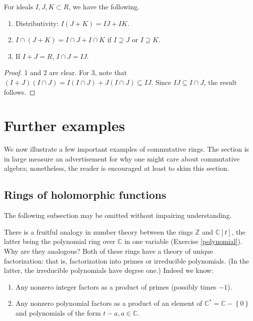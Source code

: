 \begin{proposition}
For ideals $I, J, K \subset R$, we have the following.

\begin{enumerate}
  \item Distributivity: $I(J + K) = IJ + IK$.
  \item $I \cap (J + K) = I \cap J + I \cap K$ if $I \supseteq J$ or $I \supseteq K$.
  \item If $I + J = R$, $I \cap J = IJ$.
\end{enumerate}

\begin{proof}
1 and 2 are clear.  For 3, note that $(I + J)(I \cap J) = I(I \cap J)
+ J(I \cap J) \subseteq IJ$.  Since $IJ \subseteq I \cap J$, the result
follows.
\end{proof}
\end{proposition}

\section{Further examples}

We now illustrate a few important examples of 
commutative rings. The section is in large measure an advertisement for why
one might care about commutative algebra; nonetheless, the reader is
encouraged at least to skim this section.

\subsection{Rings of holomorphic functions}

The following subsection may be omitted without impairing understanding.

There is a fruitful analogy in number theory between the rings $\mathbb{Z}$ and
$\mathbb{C}[t]$, the latter being the polynomial ring over $\mathbb{C}$ in one
variable (Exercise \ref{polynomial}).  Why are they analogous? Both of these rings have a theory of unique
factorization:  that is, factorization into primes or irreducible polynomials. (In the
latter, the irreducible polynomials have degree one.)
Indeed we know:
\begin{enumerate}
\item Any nonzero integer factors as a product of primes (possibly times $-1$). 
\item Any  nonzero polynomial factors as a product of an element of
$\mathbb{C}^* =\mathbb{C} - \left\{0\right\}$ and polynomials of the form $t -
a, a \in \mathbb{C}$.
\end{enumerate}


